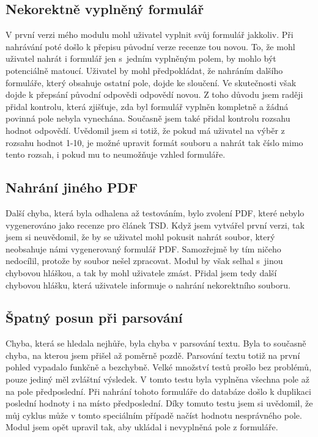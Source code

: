 \documentclass[czech,BP]{thesiskiv}
\begin{document}
\subsection{Nekorektně vyplněný formulář}
V první verzi mého modulu mohl uživatel vyplnit svůj formulář jakkoliv. Při nahrávání poté došlo k přepisu původní verze recenze tou novou. To, že mohl uživatel nahrát i formulář jen s~jedním vyplněným polem, by mohlo být potenciálně matoucí. Uživatel by mohl předpokládat, že nahráním dalšího formuláře, který obsahuje ostatní pole, dojde ke sloučení. Ve skutečnosti však dojde k přepsání původní odpovědi odpovědí novou. Z toho důvodu jsem raději přidal kontrolu, která zjišťuje, zda byl formulář vyplněn kompletně a žádná povinná pole nebyla vynechána. Současně jsem také přidal kontrolu rozsahu hodnot odpovědí. Uvědomil jsem si totiž, že pokud má uživatel na výběr z rozsahu hodnot 1-10, je možné upravit formát souboru a nahrát tak číslo mimo tento rozsah, i pokud mu to neumožňuje vzhled formuláře. 
\subsection{Nahrání jiného PDF}
Další chyba, která byla odhalena až testováním, bylo zvolení PDF, které nebylo vygenerováno jako recenze pro článek TSD. Když jsem vytvářel první verzi, tak jsem si neuvědomil, že by se uživatel mohl pokusit nahrát soubor, který neobsahuje námi vygenerovaný formulář PDF. Samozřejmě by tím ničeho nedocílil, protože by soubor nešel zpracovat. Modul by však selhal s~jinou chybovou hláškou, a tak by mohl uživatele zmást. Přidal jsem tedy další chybovou hlášku, která uživatele informuje o nahrání nekorektního souboru. 
\subsection{Špatný posun při parsování}
Chyba, která se hledala nejhůře, byla chyba v parsování textu. Byla to současně chyba, na kterou jsem přišel až poměrně pozdě. Parsování textu totiž na první pohled vypadalo funkčně a bezchybně. Velké množství testů prošlo bez problémů, pouze jediný měl zvláštní výsledek. V tomto testu byla vyplněna všechna pole až na pole předposlední. Při nahrání tohoto formuláře do databáze došlo k duplikaci poslední hodnoty i na místo předposlední. Díky tomuto testu jsem si uvědomil, že můj cyklus může v tomto speciálním případě načíst hodnotu nesprávného pole. Modul jsem opět upravil tak, aby ukládal i nevyplněná pole z formuláře. 
\end{document}
